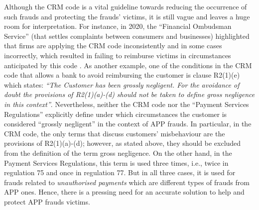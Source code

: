 Although the CRM code is a vital guideline  towards reducing the occurrence of such frauds and protecting  the frauds' victims, it is still  vague and leaves a huge room for interpretation. For instance, in 2020, the ``Financial Ombudsman Service'' (that settles complaints between consumers and businesses)  highlighted that firms  are applying the CRM code inconsistently and in some cases incorrectly, which resulted in failing to reimburse victims in circumstances anticipated by this code \cite{Financial-Ombudsman-Service-response}.  As another example, one of the conditions in the CRM code that allows a bank to avoid reimbursing the customer is clause R2(1)(e) which states: \textit{``The Customer has been grossly negligent. For the avoidance of doubt the provisions of R2(1)(a)-(d) should not be taken to define gross negligence in this context''}.  Nevertheless, neither the CRM code  nor the ``Payment Services Regulations'' \cite{Regulations}   explicitly define under which circumstances the customer is considered ``grossly negligent'' in the context of  APP frauds. In particular, in the CRM code, the only terms that discuss customers' misbehaviour are  the provisions of R2(1)(a)-(d); however, as stated above, they should be excluded from the definition of the term gross negligence. On the  other hand,  in the Payment Services Regulations, this term is used three times, i.e.,  twice in regulation 75 and once in regulation 77. But in all  three cases, it is used for frauds related to \emph{unauthorised payments} which are  different types of frauds from  APP ones. Hence, there is a pressing need for an accurate solution to help and protect  APP frauds victims. 

